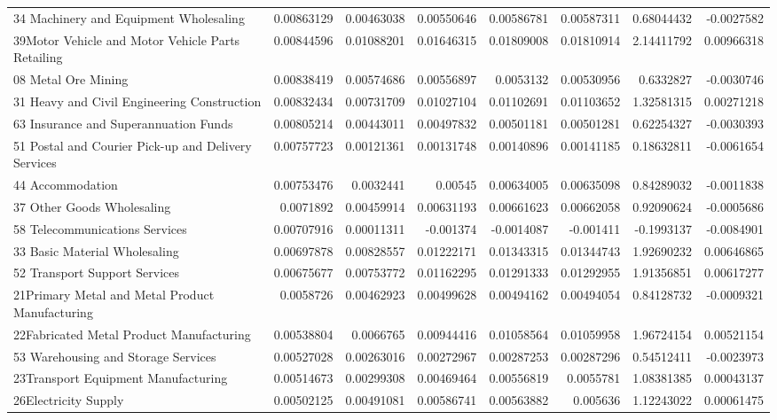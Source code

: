 \documentclass{monashthesis}
\begin{document}
\begin{table}[ht]
{\begin{tabular}{|l|r|rrrr|rr|}
    34 Machinery and Equipment Wholesaling & 0.00863129 & 0.00463038 & 0.00550646 & 0.00586781 & 0.00587311 & 0.68044432 & -0.0027582 \\
    39Motor Vehicle and Motor Vehicle Parts Retailing & 0.00844596 & 0.01088201 & 0.01646315 & 0.01809008 & 0.01810914 & 2.14411792 & 0.00966318 \\
    08 Metal Ore Mining & 0.00838419 & 0.00574686 & 0.00556897 & 0.0053132 & 0.00530956 & 0.6332827 & -0.0030746 \\
    31 Heavy and Civil Engineering Construction & 0.00832434 & 0.00731709 & 0.01027104 & 0.01102691 & 0.01103652 & 1.32581315 & 0.00271218 \\
    63 Insurance and Superannuation Funds & 0.00805214 & 0.00443011 & 0.00497832 & 0.00501181 & 0.00501281 & 0.62254327 & -0.0030393 \\
    51 Postal and Courier Pick-up and Delivery Services & 0.00757723 & 0.00121361 & 0.00131748 & 0.00140896 & 0.00141185 & 0.18632811 & -0.0061654 \\
    44 Accommodation & 0.00753476 & 0.0032441 & 0.00545 & 0.00634005 & 0.00635098 & 0.84289032 & -0.0011838 \\
    37 Other Goods Wholesaling & 0.0071892 & 0.00459914 & 0.00631193 & 0.00661623 & 0.00662058 & 0.92090624 & -0.0005686 \\
    58 Telecommunications Services & 0.00707916 & 0.00011311 & -0.001374 & -0.0014087 & -0.001411 & -0.1993137 & -0.0084901 \\
  33 Basic Material Wholesaling & 0.00697878 & 0.00828557 & 0.01222171 & 0.01343315 & 0.01344743 & 1.92690232 & 0.00646865 \\
    52 Transport Support Services & 0.00675677 & 0.00753772 & 0.01162295 & 0.01291333 & 0.01292955 & 1.91356851 & 0.00617277 \\
    21Primary Metal and Metal Product Manufacturing & 0.0058726 & 0.00462923 & 0.00499628 & 0.00494162 & 0.00494054 & 0.84128732 & -0.0009321 \\
    22Fabricated Metal Product Manufacturing & 0.00538804 & 0.0066765 & 0.00944416 & 0.01058564 & 0.01059958 & 1.96724154 & 0.00521154 \\
    53 Warehousing and Storage Services & 0.00527028 & 0.00263016 & 0.00272967 & 0.00287253 & 0.00287296 & 0.54512411 & -0.0023973 \\
    23Transport Equipment Manufacturing & 0.00514673 & 0.00299308 & 0.00469464 & 0.00556819 & 0.0055781 & 1.08381385 & 0.00043137 \\
    26Electricity Supply & 0.00502125 & 0.00491081 & 0.00586741 & 0.00563882 & 0.005636 & 1.12243022 & 0.00061475 \\

\end{tabular}}
\end{table}
\end{document}
